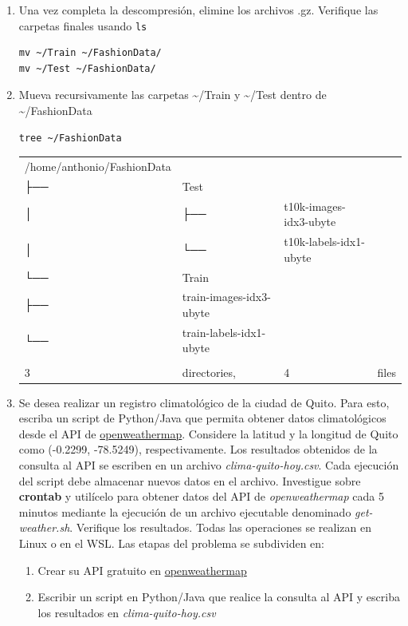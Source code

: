 \documentclass{article}
\begin{document}
\begin{enumerate}
\item Una vez completa la descompresión, elimine los archivos
.gz. Verifique las carpetas finales usando \texttt{ls}
\begin{verbatim}
mv ~/Train ~/FashionData/
mv ~/Test ~/FashionData/
\end{verbatim}

\item Mueva recursivamente las carpetas \textasciitilde{}/Train y \textasciitilde{}/Test dentro de \textasciitilde{}/FashionData
\begin{verbatim}
tree ~/FashionData
\end{verbatim}

\begin{table}[htbp]
\label{tab:org9945e8c}
\centering
\begin{tabular}{llll}
/home/anthonio/FashionData &  &  & \\
├── & Test &  & \\
│   & ├── & t10k-images-idx3-ubyte & \\
│   & └── & t10k-labels-idx1-ubyte & \\
└── & Train &  & \\
├── & train-images-idx3-ubyte &  & \\
└── & train-labels-idx1-ubyte &  & \\
 &  &  & \\
3 & directories, & 4 & files\\
\end{tabular}
\end{table}

\item Se desea realizar un registro climatológico de la ciudad de
Quito. Para esto, escriba un script de Python/Java que permita
obtener datos climatológicos desde el API de
\href{https://openweathermap.org/current\#one}{openweathermap}. Considere la latitud y la longitud de Quito como
(-0.2299, -78.5249), respectivamente. Los resultados obtenidos de
la consulta al API se escriben en un archivo
\emph{clima-quito-hoy.csv}. Cada ejecución del script debe almacenar
nuevos datos en el archivo. Investigue sobre \textbf{crontab} y utilícelo
para obtener datos del API de \emph{openweathermap} cada 5 minutos
mediante la ejecución de un archivo ejecutable denominado
\emph{get-weather.sh}. Verifique los resultados. Todas las operaciones
se realizan en Linux o en el WSL. Las etapas del problema se
subdividen en:
\begin{enumerate}
\item Crear su API gratuito en \href{https://openweathermap.org/current\#one}{openweathermap}
\item Escribir un script en Python/Java que realice la consulta al API
y escriba los resultados en \emph{clima-quito-hoy.csv}


\end{enumerate}
\end{enumerate}
\end{document}
